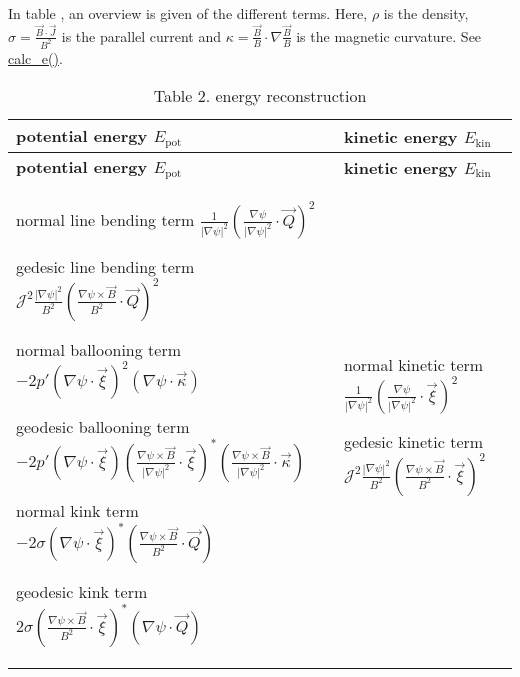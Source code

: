 In table , an overview is given of the different terms. Here, $\rho$ is the density, $\sigma = \frac{\vec{B}\cdot\vec{J}}{B^2}$ is the parallel current and $\kappa = \frac{\vec{B}}{B} \cdot \nabla \frac{\vec{B}}{B}$ is the magnetic curvature. See \hyperlink{namespacesol__ops_ae094c2a5235324b4aadb53623978d191}{calc\+\_\+e()}.

\hypertarget{page_outputs_e_rec_tab}{}
\tabulinesep=1mm
\begin{longtabu} spread 0pt [c]{*{2}{|X[-1]}|}
\caption{Table 2. energy reconstruction}\label{page_outputs_e_rec_tab}\\
\hline
\rowcolor{\tableheadbgcolor}\textbf{ potential energy $E_\text{pot}$ }&\textbf{ kinetic energy $E_\text{kin}$  }\\
\endfirsthead
\hline
\endfoot
\hline
\rowcolor{\tableheadbgcolor}\textbf{ potential energy $E_\text{pot}$ }&\textbf{ kinetic energy $E_\text{kin}$  }\\
\endhead

\begin{DoxyItemize}
\item normal line bending term $\frac{1}{\left|\nabla\psi\right|^2 }\left(\frac{\nabla \psi}{\left|\nabla \psi\right|^2}\cdot \vec{Q}\right)^2$  
\item gedesic line bending term $\mathcal{J}^2\frac{\left|\nabla \psi\right|^2}{B^2} \left( \frac{\nabla \psi \times \vec{B}}{B^2}\cdot \vec{Q} \right)^2$  
\item normal ballooning term $-2 p' \left(\nabla \psi \cdot \vec{\xi}\right)^2 \left(\nabla \psi \cdot \vec{\kappa}\right)$  
\item geodesic ballooning term $-2 p' \left( \nabla \psi \cdot \vec{\xi} \right) \left( \frac{\nabla \psi \times \vec{B}}{\left|\nabla \psi \right|^2} \cdot \vec{\xi}\right)^* \left(\frac{\nabla \psi \times \vec{B}}{\left|\nabla \psi \right|^2} \cdot \vec{\kappa}\right)$  
\item normal kink term $-2 \sigma \left(\nabla \psi \cdot \vec{\xi}\right)^* \left(\frac{\nabla \psi \times \vec{B}}{B^2}\cdot \vec{Q} \right)$  
\item geodesic kink term $ 2 \sigma \left(\frac{\nabla \psi \times \vec{B}}{B^2} \cdot \vec{\xi}\right)^* \left(\nabla \psi\cdot \vec{Q} \right)$  
\end{DoxyItemize}&
\begin{DoxyItemize}
\item normal kinetic term $\frac{1}{\left|\nabla\psi\right|^2 }\left(\frac{\nabla \psi}{\left|\nabla \psi\right|^2}\cdot \vec{\xi}\right)^2$  
\item gedesic kinetic term $\mathcal{J}^2\frac{\left|\nabla \psi\right|^2}{B^2} \left( \frac{\nabla \psi \times \vec{B}}{B^2}\cdot \vec{\xi} \right)^2$  
\end{DoxyItemize}\\
\end{longtabu}
